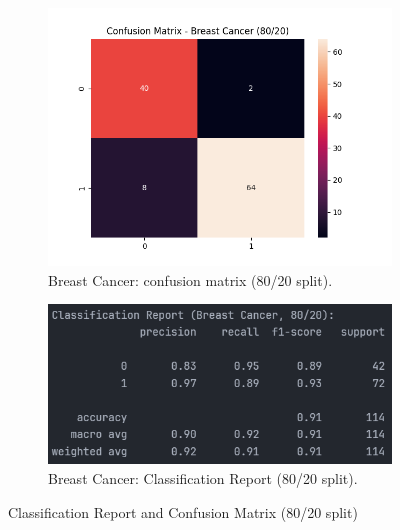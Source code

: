 \begin{figure}[H]
	\centering
	\begin{subfigure}{0.45\textwidth}
		\centering
		\includegraphics[width=\textwidth]{imgs/confusion_mat/confusion_mat__breast_cancer__80_vs_20.png}
		\caption{Breast Cancer: confusion matrix (80/20 split).}\label{fig:bc-cm-80-20}
	\end{subfigure}
	\hfill
	\begin{subfigure}{0.45\textwidth}
		\centering
		\includegraphics[width=\textwidth]{imgs/confusion_mat/class_rp__breast_cancer__80_vs_20.png}
		\caption{Breast Cancer: Classification Report (80/20 split).}\label{fig:bc-cr-80-20}
	\end{subfigure}

	\caption{Classification Report and Confusion Matrix (80/20 split)}\label{fig:bc-eval-80-20}
\end{figure}
